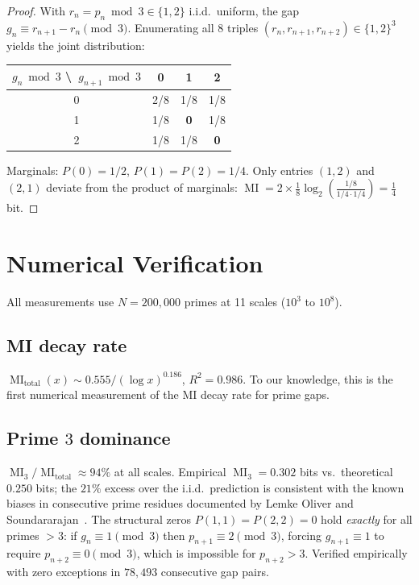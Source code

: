 \documentclass[11pt, a4paper]{amsart}
\theoremstyle{plain}
\theoremstyle{definition}
\newcommand{\MI}{\operatorname{MI}}
\begin{document}
\begin{proof}
With $r_n = p_n \bmod 3 \in \{1,2\}$ i.i.d.\ uniform, the gap $g_n \equiv r_{n+1} - r_n \pmod{3}$.
Enumerating all $8$ triples $(r_n, r_{n+1}, r_{n+2}) \in \{1,2\}^3$ yields the joint distribution:

\smallskip
\begin{center}
\begin{tabular}{c|ccc}
$g_n \bmod 3$ \textbackslash\ $g_{n+1} \bmod 3$ & 0 & 1 & 2 \\
\hline
0 & 2/8 & 1/8 & 1/8 \\
1 & 1/8 & \textbf{0} & 1/8 \\
2 & 1/8 & 1/8 & \textbf{0}
\end{tabular}
\end{center}

\smallskip\noindent
Marginals: $P(0) = 1/2$, $P(1) = P(2) = 1/4$. Only entries $(1,2)$ and $(2,1)$ deviate from the product 
of marginals:
$\MI = 2 \times \tfrac{1}{8}\log_2(\tfrac{1/8}{1/4 \cdot 1/4}) = \tfrac{1}{4}$ bit.
\end{proof}


\section{Numerical Verification}
\label{sec:numerics}

All measurements use $N = 200{,}000$ primes at 11 scales ($10^3$ to $10^8$).

\subsection{MI decay rate}
$\MI_{\mathrm{total}}(x) \sim 0.555 / (\log x)^{0.186}$, $R^2 = 0.986$.
To our knowledge, this is the first numerical measurement of the MI decay rate for prime gaps.

\subsection{Prime $3$ dominance}
$\MI_3 / \MI_{\mathrm{total}} \approx 94\%$ at all scales.
Empirical $\MI_3 = 0.302$ bits vs.\ theoretical $0.250$ bits; the $21\%$ excess over the i.i.d.\ prediction 
is consistent with the known biases in consecutive prime residues documented by Lemke Oliver and 
Soundararajan~\cite{LO2016}.
The structural zeros $P(1,1) = P(2,2) = 0$ hold \emph{exactly} for all primes $> 3$: if $g_n \equiv 1 \pmod{3}$ 
then $p_{n+1} \equiv 2 \pmod{3}$, forcing $g_{n+1} \equiv 1$ to require $p_{n+2} \equiv 0 \pmod{3}$, 
which is impossible for $p_{n+2} > 3$. Verified empirically with zero exceptions in $78{,}493$ 
consecutive gap pairs.
\end{document}
